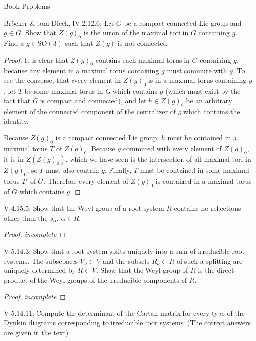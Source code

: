 \documentclass[12pt]{article}
\theoremstyle{definition}
\newenvironment{problem}[2][Problem]{\begin{trivlist}
\item[\hskip \labelsep {\bfseries #1}\hskip \labelsep {\bfseries #2.}]}{\end{trivlist}}
\begin{document}
\begin{section}{Book Problems}
	\begin{problem}{5}
		Br\"ocker \& tom Dieck, IV.2.12.6: Let $G$ be a compact connected Lie group and $g \in G$. Show that $Z(g)_0$ is the union of the maximal tori in $G$ containing $g$. Find a $g \in \text{SO}(3)$ such that $Z(g)$ is not connected.
		\begin{proof}
			It is clear that $Z(g)_0$ contains each maximal torus in $G$ containing $g$, because any element in a maximal torus containing $g$ must commute with $g$. To see the converse, that every element in $Z(g)_0$ is in a maximal torus containing $g$, let $T$ be some maximal torus in $G$ which contains $g$ (which must exist by the fact that $G$ is compact and connected), and let $h \in Z(g)_0$ be an arbitrary element of the connected component of the centralizer of $g$ which contains the identity.
			\par Because $Z(g)_0$ is a compact connected Lie group, $h$ must be contained in a maximal torus $T$ of $Z(g)_0$. Because $g$ commuted with every element of $Z(g)_0$, it is in $Z(Z(g)_0)$, which we have seen is the intersection of all maximal tori in $Z(g)_0$, so $T$ must also contain $g$. Finally, $T$ must be contained in some maximal torus $T'$ of $G$. Therefore every element of $Z(g)_0$ is contained in a maximal torus of $G$ which contains $g$.
		\end{proof}
	\end{problem}
	\begin{problem}{6}
		V.4.15.5: Show that the Weyl group of a root system $R$ contains no reflections other than the $s_\alpha$, $\alpha \in R$.
		\begin{proof}
			\textit{incomplete}
		\end{proof}
	\end{problem}
	\begin{problem}{7}
		V.5.14.3: Show that a root system splits uniquely into a sum of irreducible root systems. The subscpaces $V_\nu \subset V$ and the subsets $R_\nu \subset R$ of such a splitting are uniquely determined by $R \subset V$. Show that the Weyl group of $R$ is the direct product of the Weyl groups of the irreducible components of $R$.
		\begin{proof}
			\textit{incomplete}
		\end{proof}
	\end{problem}
	\begin{problem}{8}
		V.5.14.11: Compute the determinant of the Cartan matrix for  every type of the Dynkin diagrams corresponding to irreducible root systems. (The correct answers are given in the text)
						

\end{problem}
\end{section}
\end{document}
